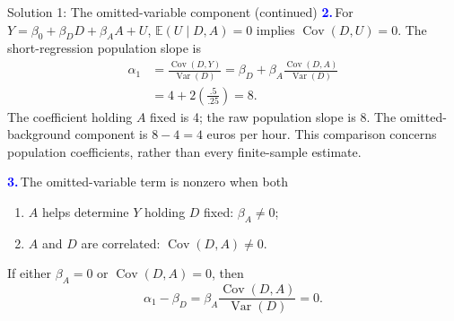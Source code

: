 \documentclass[notes,10pt, aspectratio=169]{beamer}
\newcommand{\E}{\mathbb{E}}
\newcommand{\Var}{\operatorname{Var}}
\newcommand{\Cov}{\operatorname{Cov}}
\newcommand{\answerpart}[1]{\textcolor{blue}{\textbf{#1.}}\,}
\begin{document}
\begin{frame}{Solution 1: The omitted-variable component (continued)}
\small
\answerpart{2}For $Y=\beta_0+\beta_DD+\beta_AA+U$, $\E(U\mid D,A)=0$ implies $\Cov(D,U)=0$. The short-regression population slope is
\begin{align*}
\alpha_1
&=\frac{\Cov(D,Y)}{\Var(D)}
=\beta_D+\beta_A\frac{\Cov(D,A)}{\Var(D)}\\
&=4+2\left(\frac{.5}{.25}\right)=\boxed8.
\end{align*}
The coefficient holding $A$ fixed is 4; the raw population slope is 8. The omitted-background component is $8-4=4$ euros per hour. This comparison concerns population coefficients, rather than every finite-sample estimate.
\par\vspace{7pt}
\answerpart{3}The omitted-variable term is nonzero when both
\begin{enumerate}
\setlength{\itemsep}{5pt}
\item $A$ helps determine $Y$ holding $D$ fixed: $\beta_A\ne0$;
\item $A$ and $D$ are correlated: $\Cov(D,A)\ne0$.
\end{enumerate}
If either $\beta_A=0$ or $\Cov(D,A)=0$, then
\[
\alpha_1-\beta_D=\beta_A\frac{\Cov(D,A)}{\Var(D)}=0.
\]
\end{frame}
\fi
\end{document}
